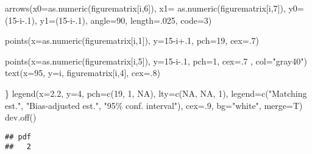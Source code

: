 \documentclass[
]{article}
\newenvironment{Shaded}{\begin{snugshade}}{\end{snugshade}}
\newcommand{\AttributeTok}[1]{\textcolor[rgb]{0.77,0.63,0.00}{#1}}
\newcommand{\ConstantTok}[1]{\textcolor[rgb]{0.00,0.00,0.00}{#1}}
\newcommand{\DecValTok}[1]{\textcolor[rgb]{0.00,0.00,0.81}{#1}}
\newcommand{\FloatTok}[1]{\textcolor[rgb]{0.00,0.00,0.81}{#1}}
\newcommand{\FunctionTok}[1]{\textcolor[rgb]{0.00,0.00,0.00}{#1}}
\newcommand{\NormalTok}[1]{#1}
\newcommand{\SpecialCharTok}[1]{\textcolor[rgb]{0.00,0.00,0.00}{#1}}
\newcommand{\StringTok}[1]{\textcolor[rgb]{0.31,0.60,0.02}{#1}}
\begin{document}
\begin{Shaded}
\begin{Highlighting}[]
\FunctionTok{arrows}\NormalTok{(}\AttributeTok{x0=}\FunctionTok{as.numeric}\NormalTok{(figurematrix[i,}\DecValTok{6}\NormalTok{]), }\AttributeTok{x1=} \FunctionTok{as.numeric}\NormalTok{(figurematrix[i,}\DecValTok{7}\NormalTok{]), }\AttributeTok{y0=}\NormalTok{(}\DecValTok{15}\SpecialCharTok{{-}}\NormalTok{i}\FloatTok{{-}.1}\NormalTok{), }\AttributeTok{y1=}\NormalTok{(}\DecValTok{15}\SpecialCharTok{{-}}\NormalTok{i}\FloatTok{{-}.1}\NormalTok{), }\AttributeTok{angle=}\DecValTok{90}\NormalTok{, }\AttributeTok{length=}\NormalTok{.}\DecValTok{025}\NormalTok{, }\AttributeTok{code=}\DecValTok{3}\NormalTok{)}

\FunctionTok{points}\NormalTok{(}\AttributeTok{x=}\FunctionTok{as.numeric}\NormalTok{(figurematrix[i,}\DecValTok{1}\NormalTok{]), }\AttributeTok{y=}\DecValTok{15}\SpecialCharTok{{-}}\NormalTok{i}\FloatTok{+.1}\NormalTok{, }\AttributeTok{pch=}\DecValTok{19}\NormalTok{, }\AttributeTok{cex=}\NormalTok{.}\DecValTok{7}\NormalTok{)}

\FunctionTok{points}\NormalTok{(}\AttributeTok{x=}\FunctionTok{as.numeric}\NormalTok{(figurematrix[i,}\DecValTok{5}\NormalTok{]), }\AttributeTok{y=}\DecValTok{15}\SpecialCharTok{{-}}\NormalTok{i}\FloatTok{{-}.1}\NormalTok{, }\AttributeTok{pch=}\DecValTok{1}\NormalTok{, }\AttributeTok{cex=}\NormalTok{.}\DecValTok{7}\NormalTok{ ,  }\AttributeTok{col=}\StringTok{"gray40"}\NormalTok{)}
\FunctionTok{text}\NormalTok{(}\AttributeTok{x=}\DecValTok{95}\NormalTok{, }\AttributeTok{y=}\NormalTok{i, figurematrix[i,}\DecValTok{4}\NormalTok{], }\AttributeTok{cex=}\NormalTok{.}\DecValTok{8}\NormalTok{)}

\NormalTok{\}}
\FunctionTok{legend}\NormalTok{(}\AttributeTok{x=}\FloatTok{2.2}\NormalTok{, }\AttributeTok{y=}\DecValTok{4}\NormalTok{, }\AttributeTok{pch=}\FunctionTok{c}\NormalTok{(}\DecValTok{19}\NormalTok{, }\DecValTok{1}\NormalTok{, }\ConstantTok{NA}\NormalTok{), }\AttributeTok{lty=}\FunctionTok{c}\NormalTok{(}\ConstantTok{NA}\NormalTok{, }\ConstantTok{NA}\NormalTok{, }\DecValTok{1}\NormalTok{), }\AttributeTok{legend=}\FunctionTok{c}\NormalTok{(}\StringTok{"Matching est."}\NormalTok{, }\StringTok{"Bias{-}adjusted est."}\NormalTok{, }\StringTok{"95\% conf. interval"}\NormalTok{), }\AttributeTok{cex=}\NormalTok{.}\DecValTok{9}\NormalTok{, }\AttributeTok{bg=}\StringTok{"white"}\NormalTok{, }\AttributeTok{merge=}\NormalTok{T)}
\FunctionTok{dev.off}\NormalTok{()}
\end{Highlighting}
\end{Shaded}

\begin{verbatim}
## pdf 
##   2
\end{verbatim}
\end{document}

